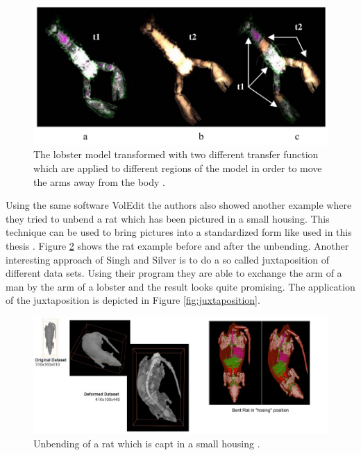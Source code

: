 \begin{figure} [htb!]
    \centering
	\includegraphics[width=13cm]{content/images/lobster}
	\caption{The lobster model transformed with two different transfer function which are applied to different regions of the model in order to move the arms away from the body \cite{Singh2004}.} 
	\label{fig:lobster}
\end{figure}

Using the same software VolEdit the authors also showed another example where they tried to unbend a rat which has been pictured in a small housing. This technique can be used to bring pictures into a standardized form like used in this thesis \cite{D.SilverK.yawsC.CorreaW.HurtP.Mason2005VolumetricSimulations}. Figure \ref{fig:mouse} shows the rat example before and after the unbending. Another interesting approach of Singh and Silver is to do a so called juxtaposition of different data sets. Using their program they are able to exchange the arm of a man by the arm of a lobster and the result looks quite promising. The application of the juxtaposition is depicted in Figure \ref{fig:juxtaposition}.

\begin{figure}
    \centering
	\includegraphics[width=13cm]{content/images/mouse}
	\caption{Unbending of a rat which is capt in a small housing \cite{D.SilverK.yawsC.CorreaW.HurtP.Mason2005VolumetricSimulations}.} 
	\label{fig:mouse}
\end{figure}


